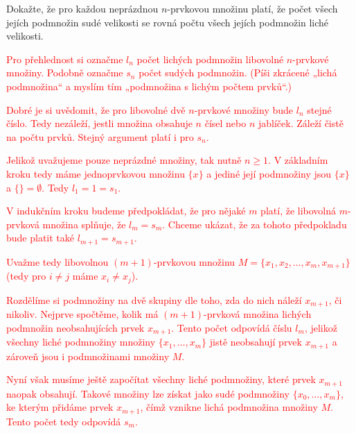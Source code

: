 \documentclass[10pt]{article}
\begin{document}
\begin{problem}
Dokažte, že pro každou neprázdnou $n$-prvkovou množinu platí, že počet všech jejích podmnožin sudé velikosti se rovná počtu všech jejích podmnožin liché velikosti. 

\vspace{5pt}
\noindent
\textcolor{red}{Pro přehlednost si označme $l_n$ počet lichých podmnožin libovolné $n$-prvkové množiny. Podobně označme $s_n$ počet sudých podmnožin. (Píši zkrácené „lichá podmnožina“ a myslím tím „podmnožina s lichým počtem prvků“.)}

\vspace{5pt}
\noindent
\textcolor{red}{Dobré je si uvědomit, že pro libovolné dvě $n$-prvkové množiny bude $l_n$ stejné číslo. Tedy nezáleží, jestli množina obsahuje $n$ čísel nebo $n$ jablíček. Záleží čistě na počtu prvků. Stejný argument platí i pro $s_n$.}

\vspace{5pt}
\noindent
\textcolor{red}{Jelikož uvažujeme pouze neprázdné množiny, tak nutně $n \geq 1$. V základním kroku tedy máme jednoprvkovou množinu $\{x\}$ a jediné její podmnožiny jsou $\{x\}$ a $\{\} = \emptyset$. Tedy $l_1 = 1 = s_1$.}

\vspace{5pt}
\noindent
\textcolor{red}{V indukčním kroku budeme předpokládat, že pro nějaké $m$ platí, že libovolná $m$-prvková množina splňuje, že $l_m = s_m$. Chceme ukázat, že za tohoto předpokladu bude platit také $l_{m+1} = s_{m+1}$.}


\vspace{5pt}
\noindent
\textcolor{red}{Uvažme tedy libovolnou $(m+1)$-prvkovou množinu $M = \{ x_1, x_2, \ldots , x_m, x_{m+1}\}$ (tedy pro $i \neq j$ máme $x_i \neq x_j$).}

\vspace{5pt}
\noindent
\textcolor{red}{Rozdělíme si podmnožiny na dvě skupiny dle toho, zda do nich náleží $x_{m+1}$, či nikoliv. Nejprve spočtěme, kolik má $(m+1)$-prvková množina lichých podmnožin neobsahujících prvek $x_{m+1}$. Tento počet odpovídá číslu $l_m$, jelikož všechny liché podmnožiny množiny $\{x_1,\ldots,x_m\}$ jistě neobsahují prvek $x_{m+1}$ a zároveň jsou i podmnožinami množiny $M$.}

\vspace{5pt}
\noindent
\textcolor{red}{Nyní však musíme ještě započítat všechny liché podmnožiny, které prvek $x_{m+1}$ naopak obsahují. Takové množiny lze získat jako sudé podmnožiny $\{x_0,\ldots,x_m\}$, ke kterým přidáme prvek $x_{m+1}$, čímž vznikne lichá podmnožina množiny $M$. Tento počet tedy odpovídá $s_m$.}


\end{problem}
\end{document}
